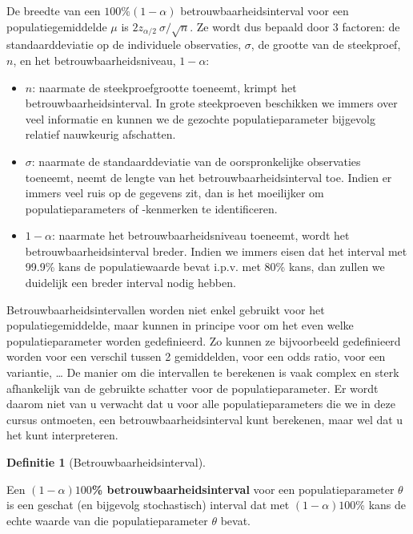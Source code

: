 \documentclass[
  12pt,dutch]{book}
\theoremstyle{definition}
\newtheorem{definition}{Definitie}[chapter]
\theoremstyle{definition}
\theoremstyle{definition}
\theoremstyle{definition}
\theoremstyle{remark}
\begin{document}
De breedte van een \(100\%(1-\alpha)\) betrouwbaarheidsinterval voor een
populatiegemiddelde \(\mu\) is \(2 z_{\alpha/2} \ \sigma/\sqrt{n}\). Ze wordt
dus bepaald door 3 factoren: de standaarddeviatie op de individuele
observaties, \(\sigma\), de grootte van de steekproef, \(n\), en het
betrouwbaarheidsniveau, \(1-\alpha\):

\begin{itemize}
\item
  \(n\): naarmate de steekproefgrootte toeneemt, krimpt het
  betrouwbaarheidsinterval. In grote steekproeven beschikken we immers over veel informatie en kunnen we de gezochte populatieparameter bijgevolg relatief nauwkeurig afschatten.
\item
  \(\sigma\): naarmate de standaarddeviatie van de oorspronkelijke
  observaties toeneemt, neemt de lengte van het betrouwbaarheidsinterval toe. Indien er immers veel ruis op de gegevens zit, dan is het moeilijker om populatieparameters of -kenmerken te identificeren.
\item
  \(1-\alpha\): naarmate het betrouwbaarheidsniveau toeneemt, wordt het
  betrouwbaarheidsinterval breder. Indien we immers eisen dat het interval met 99.9\% kans de populatiewaarde bevat i.p.v. met 80\% kans, dan zullen we duidelijk een breder interval nodig hebben.
\end{itemize}

Betrouwbaarheidsintervallen worden niet enkel gebruikt voor het
populatiegemiddelde, maar kunnen in principe voor om het even welke
populatieparameter worden gedefinieerd. Zo kunnen ze bijvoorbeeld
gedefinieerd worden voor een verschil tussen 2 gemiddelden, voor een odds ratio, voor een variantie, \ldots{} De manier om die
intervallen te berekenen is vaak complex en sterk afhankelijk van de
gebruikte schatter voor de populatieparameter. Er wordt daarom niet van u
verwacht dat u voor alle populatieparameters die we in deze cursus
ontmoeten, een betrouwbaarheidsinterval kunt berekenen, maar wel dat u het
kunt interpreteren.

\begin{definition}[Betrouwbaarheidsinterval]
\protect\hypertarget{def:unnamed-chunk-149}{}\label{def:unnamed-chunk-149}~
\end{definition}

Een \textbf{\((1-\alpha)100\)\% betrouwbaarheidsinterval} voor een populatieparameter \(\theta\) is een
geschat (en bijgevolg stochastisch) interval dat met \((1-\alpha)100\)\% kans
de echte waarde van die populatieparameter \(\theta\) bevat.
\end{document}
